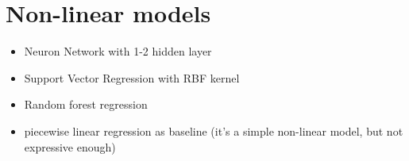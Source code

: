 \documentclass[12pt]{article}
\begin{document}
\section{Non-linear models}
\begin{itemize}
\item Neuron Network with 1-2 hidden layer
\item Support Vector Regression with RBF kernel
\item Random forest regression~\cite{randomForestWiki2016}
\item piecewise linear regression as baseline (it's a simple non-linear model, but not expressive enough)
\end{itemize}
\newpage


\end{document}
